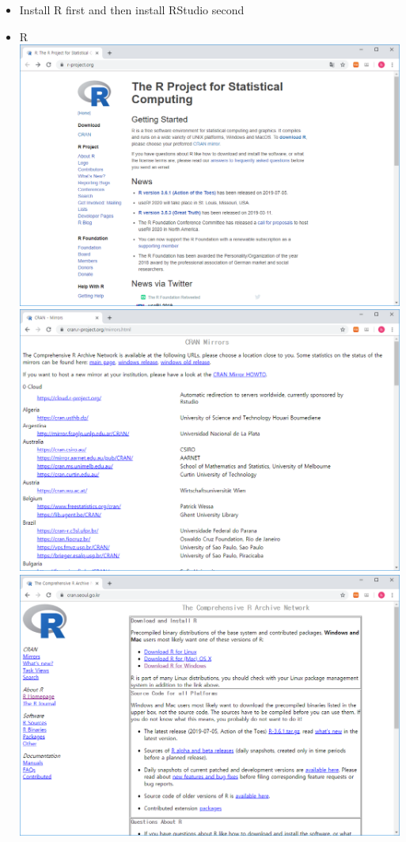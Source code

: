 \documentclass[]{book}
\begin{document}
\begin{itemize}
\item
  Install R first and then install RStudio second
\item
  R
  \includegraphics{images/01-01.PNG}\\
  \includegraphics{images/01-02.PNG}\\
  \includegraphics{images/01-03.PNG}\\

\end{itemize}
\end{document}

